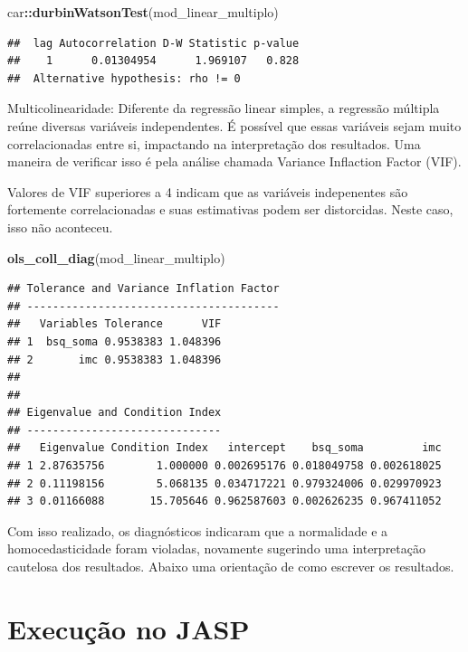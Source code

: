 \documentclass[
]{book}
\newenvironment{Shaded}{\begin{snugshade}}{\end{snugshade}}
\newcommand{\KeywordTok}[1]{\textcolor[rgb]{0.13,0.29,0.53}{\textbf{#1}}}
\newcommand{\NormalTok}[1]{#1}
\newcommand{\OperatorTok}[1]{\textcolor[rgb]{0.81,0.36,0.00}{\textbf{#1}}}
\begin{document}
\begin{Shaded}
\begin{Highlighting}[]
\NormalTok{car}\OperatorTok{::}\KeywordTok{durbinWatsonTest}\NormalTok{(mod_linear_multiplo)}
\end{Highlighting}
\end{Shaded}

\begin{verbatim}
##  lag Autocorrelation D-W Statistic p-value
##    1      0.01304954      1.969107   0.828
##  Alternative hypothesis: rho != 0
\end{verbatim}

Multicolinearidade: Diferente da regressão linear simples, a regressão múltipla reúne diversas variáveis independentes. É possível que essas variáveis sejam muito correlacionadas entre si, impactando na interpretação dos resultados. Uma maneira de verificar isso é pela análise chamada Variance Inflaction Factor (VIF).

Valores de VIF superiores a 4 indicam que as variáveis indepenentes são fortemente correlacionadas e suas estimativas podem ser distorcidas. Neste caso, isso não aconteceu.

\begin{Shaded}
\begin{Highlighting}[]
\KeywordTok{ols_coll_diag}\NormalTok{(mod_linear_multiplo)}
\end{Highlighting}
\end{Shaded}

\begin{verbatim}
## Tolerance and Variance Inflation Factor
## ---------------------------------------
##   Variables Tolerance      VIF
## 1  bsq_soma 0.9538383 1.048396
## 2       imc 0.9538383 1.048396
## 
## 
## Eigenvalue and Condition Index
## ------------------------------
##   Eigenvalue Condition Index   intercept    bsq_soma         imc
## 1 2.87635756        1.000000 0.002695176 0.018049758 0.002618025
## 2 0.11198156        5.068135 0.034717221 0.979324006 0.029970923
## 3 0.01166088       15.705646 0.962587603 0.002626235 0.967411052
\end{verbatim}

Com isso realizado, os diagnósticos indicaram que a normalidade e a homocedasticidade foram violadas, novamente sugerindo uma interpretação cautelosa dos resultados. Abaixo uma orientação de como escrever os resultados.

\hypertarget{execuuxe7uxe3o-no-jasp-16}{%
\section{Execução no JASP}\label{execuuxe7uxe3o-no-jasp-16}}
\end{document}
